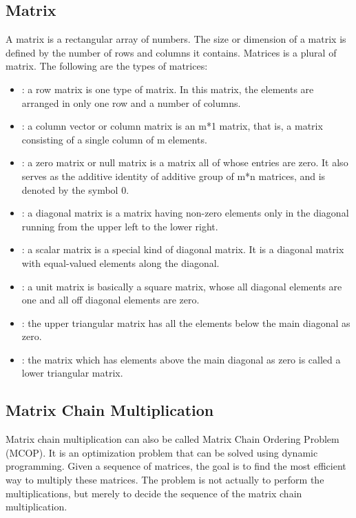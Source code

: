\documentclass[12pt]{report}
\begin{document}
	\subsection{Matrix}
	A matrix is a rectangular array of numbers. The size or dimension of a matrix is defined by the number of rows and columns it contains. Matrices is a plural of matrix. The following are the types of matrices:
	\begin{itemize}
		\item
		: a row matrix is one type of matrix. In this matrix, the elements are arranged in only one row and a number of columns.
		\item
		: a column vector or column matrix is an m*1 matrix, that is, a matrix consisting of a single column of m elements.
		\item
		: a zero matrix or null matrix is a matrix all of whose entries are zero. It also serves as the additive identity of additive group of m*n matrices, and is denoted by the symbol 0.
		\item
		: a diagonal matrix is a matrix having non-zero elements only in the diagonal running from the upper left to the lower right.
		\item
		: a scalar matrix is a special kind of diagonal matrix. It is a diagonal matrix with equal-valued elements along the diagonal. 
		\item
		: a unit matrix is basically a square matrix, whose all diagonal elements are one and all off diagonal elements are zero. 
		\item
		: the upper triangular matrix has all the elements below the main diagonal as zero. 
		\item
		: the matrix which has elements above the main diagonal as zero is called a lower triangular matrix. 
	\end{itemize}
	\item
	\subsection{Matrix Chain Multiplication}
	Matrix chain multiplication can also be called Matrix Chain Ordering Problem (MCOP). It is an optimization problem that can be solved using dynamic programming. Given a sequence of matrices, the goal is to find the most efficient way to multiply these matrices. The problem is not actually to perform the multiplications, but merely to decide the sequence of the matrix chain multiplication.
	
\end{document}
